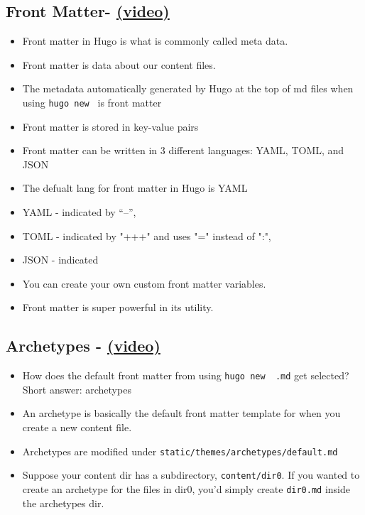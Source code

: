 \subsection{Front Matter- \href{https://youtu.be/Yh2xKRJGff4?list=PLLAZ4kZ9dFpOnyRlyS-liKL5ReHDcj4G3 }{(video)} }
\begin{itemize}
\item
	Front matter in Hugo is what is commonly called meta data.
\item
	Front matter is data about our content files.
\item
	The metadata automatically generated by Hugo at the top of md files when using \texttt{hugo new } is front matter
\item
	Front matter is stored in key-value pairs
\item
	Front matter can be written in 3 different languages: YAML, TOML, and JSON
\item
	The defualt lang for front matter in Hugo is YAML
\item
	YAML - indicated by ``--'',
\item
	TOML - indicated by "+++" and uses "=" instead of ":",
\item
	JSON - indicated
\item
	You can create your own custom front matter variables.
\item
	Front matter is super powerful in its utility.
\end{itemize}


\subsection{Archetypes - \href{https://youtu.be/bcme8AzVh6o?list=PLLAZ4kZ9dFpOnyRlyS-liKL5ReHDcj4G3 }{(video)} }
\begin{itemize}
\item
	How does the default front matter from using \texttt{hugo new ~.md} get selected? Short answer: archetypes
\item
	An archetype is basically the default front matter template for when you create a new content file.
\item
	Archetypes are modified under \texttt{static/themes/archetypes/default.md}
\item
	Suppose your content dir has a subdirectory, \texttt{content/dir0}. If you wanted to create an archetype for the files in dir0, you'd simply create \texttt{dir0.md} inside the archetypes dir.
\end{itemize}

